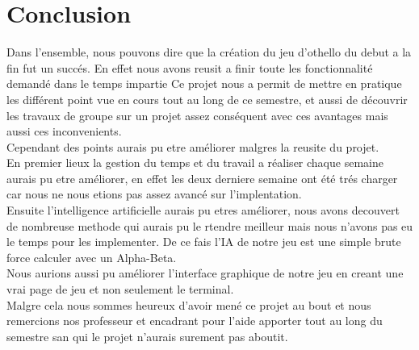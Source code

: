 \section{Conclusion}
Dans l'ensemble, nous pouvons dire que la création du jeu d'othello du debut a la fin fut un succés.
En effet nous avons reusit a finir toute les fonctionnalité demandé dans le temps impartie
Ce projet nous a permit de mettre en pratique les différent point vue en cours tout au long de ce semestre, et aussi de découvrir  les travaux de groupe  sur un projet assez conséquent avec ces avantages mais aussi ces inconvenients.
\\ Cependant des points aurais pu etre améliorer malgres la reusite du projet.
\\ En premier lieux la gestion du temps et du travail a réaliser chaque semaine  aurais pu etre améliorer, en effet les deux derniere semaine ont été trés charger car nous ne nous etions pas assez avancé sur l'implentation.
\\Ensuite l'intelligence artificielle aurais pu etres améliorer, nous avons decouvert de nombreuse methode qui aurais pu le rtendre meilleur mais nous n'avons pas eu le temps pour les implementer. De ce fais l'IA de notre jeu est une simple brute force calculer avec un Alpha-Beta.
\\ Nous aurions aussi pu améliorer l'interface graphique de notre jeu en creant une vrai page de jeu et non seulement le terminal.
\\Malgre cela nous sommes heureux d'avoir mené ce projet au bout et nous remercions nos professeur et encadrant pour l'aide apporter tout au long du semestre san qui le projet n'aurais surement pas aboutit.

